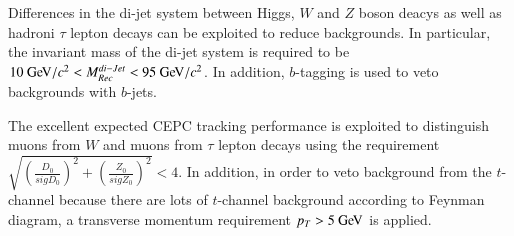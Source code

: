 \documentclass[11pt,a4paper]{cepcnote}
\begin{document}
Differences in the di-jet system between Higgs, $W$ and $Z$ boson deacys
as well as hadroni $\tau$ lepton decays can be exploited to reduce backgrounds.
In particular, the invariant mass of the di-jet system is required to be
$10\gev/c^2 < M_{Rec}^{di-Jet} < 95\gev/c^2 $. In addition, $b$-tagging is used
to veto backgrounds with $b$-jets.

The excellent expected CEPC tracking performance is exploited to
distinguish muons from $W$  and muons from $\tau$ lepton decays
using the requirement 
$\sqrt{(\frac{D_{0}}{sigD_{0}})^2+(\frac{Z_{0}}{sigZ_{0}})^2} < 4$.
In addition, in order to veto background from the $t$-channel
{\color{blue}because there are lots of $t$-channel background according to Feynman diagram, }
a transverse momentum requirement $p_T > 5\gev$ is applied.

\begin{figure}[H]
\centering
\end{figure}
\end{document}
